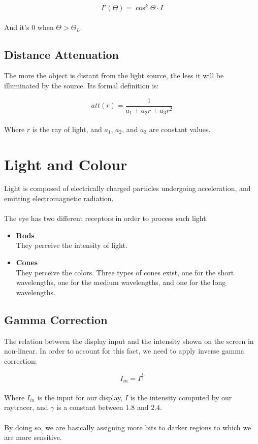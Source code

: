 \documentclass{article}
\begin{document}
\[ I'(\Theta) = \cos^k\Theta \cdot I \] \\
And it's 0 when $\Theta > \Theta_L$.

\subsection{Distance Attenuation}
The more the object is distant from the light source, the less it will be illuminated by the source. Its formal definition is:

\[ att(r) = \frac{1}{a_1 + a_2r + a_3r^2} \] \\
Where $r$ is the ray of light, and $a_1$, $a_2$, and $a_3$ are constant values.

\section{Light and Colour}
Light is composed of electrically charged particles undergoing acceleration, and emitting electromagnetic radiation. \\ \\
The eye has two different receptors in order to process such light:

\begin{itemize}
	\item \textbf{Rods}
	\vspace{.2cm} \\
	They perceive the intensity of light.
	
	\item \textbf{Cones}
	\vspace{.2cm} \\
	They perceive the colors. Three types of cones exist, one for the short wavelengths, one for the medium wavelengths, and one for the long wavelengths.
\end{itemize}

\subsection{Gamma Correction}
The relation between the display input and the intensity shown on the screen in non-linear. In order to account for this fact, we need to apply inverse gamma correction:

\[ I_{in} = I ^{\frac{1}{\gamma}} \] \\
Where $I_{in}$ is the input for our display, $I$ is the intensity computed by our raytracer, and $\gamma$ is a constant between $1.8$ and $2.4$. \\ \\
By doing so, we are basically assigning more bits to darker regions to which we are more sensitive.
\end{document}
